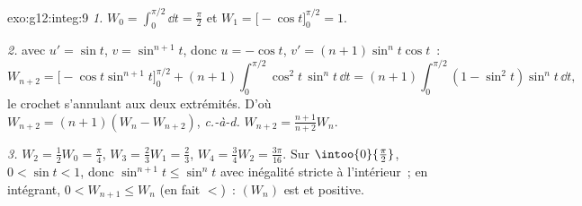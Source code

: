 \begin{solution}{exo:g12:integ:9}
\emph{1.} $W_0 = \int_0^{\pi/2} \dd t = \frac{\pi}{2}$ et
$W_1 = \bigl[-\cos t\bigr]_0^{\pi/2} = 1$.

\emph{2.}  avec $u' = \sin t$,
$v = \sin^{n+1} t$, donc $u = -\cos t$,
$v' = (n+1)\sin^n t \cos t$~:
\[
W_{n+2} = \bigl[-\cos t \sin^{n+1} t\bigr]_0^{\pi/2}
+ (n+1)\int_0^{\pi/2} \cos^2 t\,\sin^n t\,\dd t
= (n+1)\int_0^{\pi/2} (1 - \sin^2 t)\sin^n t\,\dd t,
\]
le crochet s'annulant aux deux extrémités. D'où
$W_{n+2} = (n+1)(W_n - W_{n+2})$, \emph{c.-à-d.}
$W_{n+2} = \frac{n+1}{n+2} W_n$.

\emph{3.} $W_2 = \frac12 W_0 = \frac{\pi}{4}$,
$W_3 = \frac23 W_1 = \frac23$,
$W_4 = \frac34 W_2 = \frac{3\pi}{16}$.
Sur $\intoo{0}{\frac\pi2}$, $0 < \sin t < 1$, donc
$\sin^{n+1} t \leq \sin^n t$ avec inégalité stricte à l'intérieur~; en
intégrant, $0 < W_{n+1} \leq W_n$ (en fait $<$)~: $(W_n)$ est 
et positive.
\end{solution}

